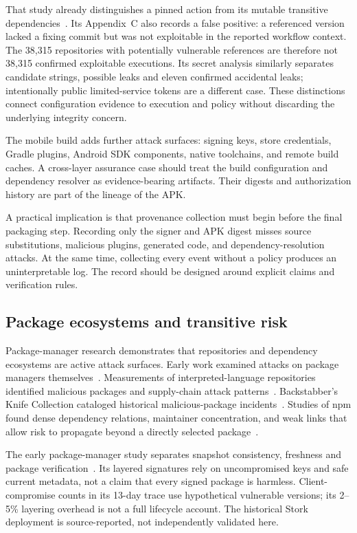 That study already distinguishes a pinned action from its mutable transitive dependencies~\cite{githubci}. Its Appendix~C also records a false positive: a referenced version lacked a fixing commit but was not exploitable in the reported workflow context. The 38,315 repositories with potentially vulnerable references are therefore not 38,315 confirmed exploitable executions. Its secret analysis similarly separates candidate strings, possible leaks and eleven confirmed accidental leaks; intentionally public limited-service tokens are a different case. These distinctions connect configuration evidence to execution and policy without discarding the underlying integrity concern.

The mobile build adds further attack surfaces: signing keys, store credentials, Gradle plugins, Android SDK components, native toolchains, and remote build caches. A cross-layer assurance case should treat the build configuration and dependency resolver as evidence-bearing artifacts. Their digests and authorization history are part of the lineage of the APK.

A practical implication is that provenance collection must begin before the final packaging step. Recording only the signer and APK digest misses source substitutions, malicious plugins, generated code, and dependency-resolution attacks. At the same time, collecting every event without a policy produces an uninterpretable log. The record should be designed around explicit claims and verification rules.

\subsection{Package ecosystems and transitive risk}

Package-manager research demonstrates that repositories and dependency ecosystems are active attack surfaces. Early work examined attacks on package managers themselves~\cite{packagemanagers}. Measurements of interpreted-language repositories identified malicious packages and supply-chain attack patterns~\cite{duanpackages}. Backstabber's Knife Collection cataloged historical malicious-package incidents~\cite{backstabber}. Studies of npm found dense dependency relations, maintainer concentration, and weak links that allow risk to propagate beyond a directly selected package~\cite{npmworld,weaklinks}.

The early package-manager study separates snapshot consistency, freshness and package verification~\cite{packagemanagers}. Its layered signatures rely on uncompromised keys and safe current metadata, not a claim that every signed package is harmless. Client-compromise counts in its 13-day trace use hypothetical vulnerable versions; its 2--5\% layering overhead is not a full lifecycle account. The historical Stork deployment is source-reported, not independently validated here.

